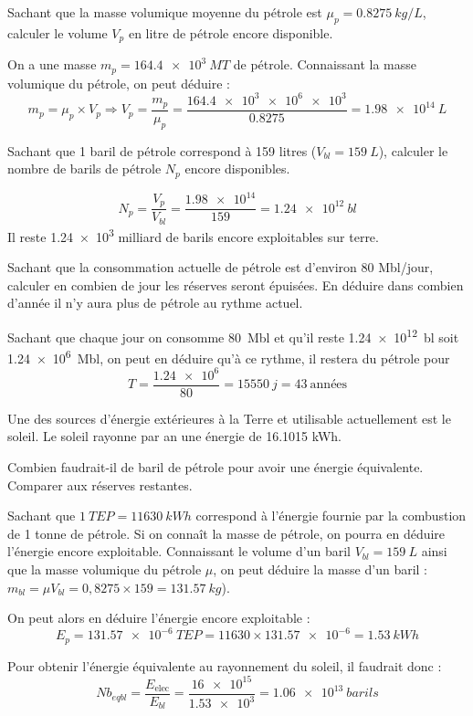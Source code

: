 \documentclass[addpoints, answers]{exam}
\begin{document}
\begin{questions}
\question Sachant que la masse volumique moyenne du pétrole est
$\mu_p = \SI{0,8275}{kg/L}$, calculer le volume $V_p$ en litre de pétrole encore
disponible.
\begin{solution}
On a une masse $m_p = \SI{164.4e3}{MT}$ de pétrole. Connaissant la masse volumique du pétrole, on peut déduire : $$ m_p = \mu_p \times V_p \Rightarrow V_p = \frac{m_p}{\mu_p} = \frac{\num{164.4e3}\num{e6}\num{e3}}{0.8275} = \SI{1.98e14}{L} $$
\end{solution}
\item Sachant que 1 baril de pétrole correspond à 159 litres ($V_{bl} = \SI{159}{L}$),
calculer le nombre de barils de pétrole $N_p$ encore disponibles.
\begin{solution}
$$N_p = \frac{V_p}{V_{bl}} = \frac{\num{1,98e14}}{159} = \SI{1,24e12}{bl}$$
Il reste \num{1,24e3} milliard de barils encore exploitables sur terre. 
\end{solution}
\item Sachant que la consommation actuelle de pétrole est d’environ
80 Mbl/jour, calculer en combien de jour les réserves seront
épuisées. En déduire dans combien d’année il n’y aura plus de
pétrole au rythme actuel.
\begin{solution}
    Sachant que chaque jour on consomme \SI{80}{Mbl} et qu'il reste \SI{1,24e12}{bl} soit \SI{1,24e6}{Mbl}, on peut en déduire qu'à ce rythme, il restera du pétrole pour $$T = \frac{\num{1,24e6}}{\num{80}} = \SI{15550}{j} = \SI{43}{\text{années}}$$
\end{solution}

Une des sources d'énergie extérieures à la Terre et utilisable
actuellement est le soleil. Le soleil rayonne par an une énergie de
16.1015 kWh.

\item Combien faudrait-il de baril de pétrole pour avoir une énergie
équivalente. Comparer aux réserves restantes.
\begin{solution}
    Sachant que $\SI{1}{TEP} = \SI{11630}{kWh}$ correspond à l'énergie fournie par la combustion de 1 tonne de pétrole. Si on connaît la masse de pétrole, on pourra en déduire l'énergie encore exploitable.
    Connaissant le volume d'un baril $V_{bl} = \SI{159}{L}$ ainsi que la masse volumique du pétrole $\mu$, on peut déduire la masse d'un baril : $m_{bl} = \mu V_{bl} = 0,8275 \times \num{159} =  \SI{131,57}{kg}$). 
    
    On peut alors en déduire l'énergie encore exploitable : 
    $$E_p = \SI{131,57e-6}{TEP} = 11630\times \num{131,57e-6} = \SI{1,53}{kWh}$$
    
    Pour obtenir l'énergie équivalente au rayonnement du soleil, il faudrait donc : 
    $$Nb_{eq bl} = \frac{E_{\text{elec}}}{E_{bl}} = \frac{\num{16e15}}{\num{1,53e3}} = \SI{1,06e13}{barils}$$
\end{solution}
\end{questions}
\end{document}
